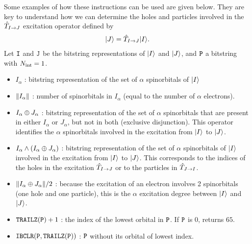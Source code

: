 \documentclass[./thesis.tex]{subfiles}
\begin{document}
Some examples of how these instructions can be used are given below. They are key to understand how we can determine the holes and particles involved in the ${\hat{T}_{I \rightarrow J}}$ excitation operator defined by
\begin{equation}
\label{eq:ordering_removed}
{\ket{J}} = {\hat{T}_{I \rightarrow J}} {\ket{I}}.
\end{equation}
Let ${\texttt{I}}$ and ${{\texttt{J}}}$ be the bitstring representations of ${\ket{I}}$ and ${\ket{J}}$, and ${\texttt{P}}$ a bitstring with ${N_\text{int}}=1$. 


\begin{itemize}
	      
	\item $I_{\alpha}$ : bitstring representation of the set of $\alpha$ spinorbitals of ${\ket{I}}$
	            
	\item $\norm{I_{\alpha}}$ : number of spinorbitals in $I_{\alpha}$ (equal to the number of $\alpha$ electrons).
	            
	\item $I_{\alpha} \oplus J_{\alpha}$ : bitstring representation of the set of $\alpha$ spinorbitals that are present in either $I_{\alpha}$ or $J_{\alpha}$, but not in both (exclusive disjunction).
        This operator identifies the $\alpha$ spinorbitals involved in the excitation from ${\ket{I}}$ to ${\ket{J}}$. 
	            
	\item $I_{\alpha} \wedge \qty(I_{\alpha} \oplus J_{\alpha})$ : 
        bitstring representation of the set of $\alpha$ spinorbitals of ${\ket{I}}$ involved in the excitation from ${\ket{I}}$ to ${\ket{J}}$. This corresponds to the indices of the holes in the excitation ${\hat{T}_{I \rightarrow J}}$ or to the particles in ${\hat{T}_{J \rightarrow I}}$. 
	            
	\item $\norm{I_{\alpha} \oplus J_{\alpha}}/2$ : because the excitation of an electron involves 2 spinorbitals (one hole and one particle), this is the $\alpha$ excitation degree between ${\ket{I}}$ and ${\ket{J}}$.
	            
	\item $\text{\texttt{TRAILZ}}({\texttt{P}})+1$ : the index of the lowest orbital in ${\texttt{P}}$. If ${\texttt{P}}$ is $0$, returns $65$.
	            
	\item $\text{\texttt{IBCLR}}({\texttt{P}},\text{\texttt{TRAILZ}}({\texttt{P}}))$ : ${\texttt{P}}$ without its orbital of lowest index.

\end{itemize}
\end{document}
